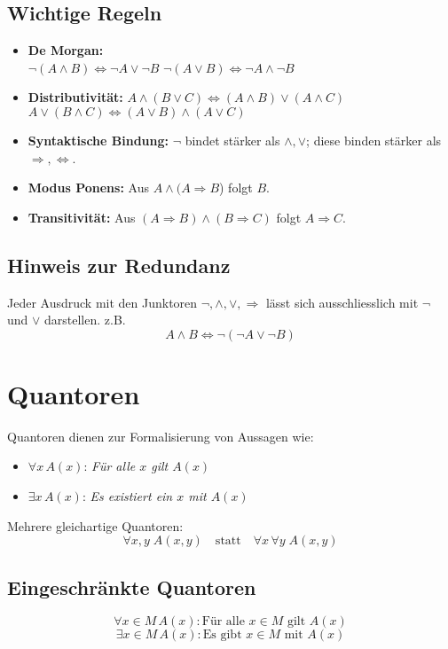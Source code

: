 \documentclass[10pt,landscape]{article}
\begin{document}
\begin{multicols*}{4}
\subsection{Wichtige Regeln}
\begin{itemize}
  \item \textbf{De Morgan:}\\ 
    \(\lnot(A\land B)\Leftrightarrow \lnot A\lor\lnot B\) 
    \(\lnot(A\lor B)\Leftrightarrow\lnot A\land\lnot B\)
  \item \textbf{Distributivität:}
    \(A\land(B\lor C)\Leftrightarrow (A\land B)\lor(A\land C)\)
    \(A\lor(B\land C)\Leftrightarrow (A\lor B)\land(A\lor C)\)
  \item \textbf{Syntaktische Bindung:} \(\lnot\) bindet stärker als \(\land,\lor\); diese binden stärker als \(\Rightarrow,\Leftrightarrow\).
  \item \textbf{Modus Ponens:} Aus \(A \land (A\Rightarrow B\)) folgt \(B\).
  \item \textbf{Transitivität:} Aus \((A\Rightarrow B) \land (B\Rightarrow C)\) folgt \(A\Rightarrow C\).
\end{itemize}

\subsection{Hinweis zur Redundanz}
Jeder Ausdruck mit den Junktoren $\lnot,\land,\lor,\Rightarrow$ lässt sich ausschliesslich mit \(\lnot\) und \(\lor\) darstellen. z.B.
$$A\land B \Leftrightarrow \lnot(\lnot A\lor\lnot B)$$

\section{Quantoren}
Quantoren dienen zur Formalisierung von Aussagen wie:
\begin{itemize}
  \item $\forall x\,A(x)$: \emph{Für alle $x$ gilt $A(x)$}
  \item $\exists x\,A(x)$: \emph{Es existiert ein $x$ mit $A(x)$}
\end{itemize}

Mehrere gleichartige Quantoren:
$$\forall x,y\;A(x,y) \quad\text{statt}\quad \forall x\,\forall y\;A(x,y)$$


\subsection{Eingeschränkte Quantoren}
$$\forall x \in M\,A(x): \text{Für alle }x\in M \text{ gilt }A(x)$$
$$\exists x \in M\,A(x): \text{Es gibt }x\in M \text{ mit }A(x)$$


\end{multicols*}
\end{document}
